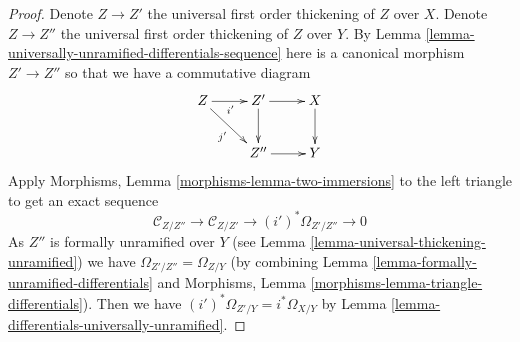 \documentclass[10pt,a4paper]{amsart}
\theoremstyle{plain}
\theoremstyle{definition}
\theoremstyle{remark}
\numberwithin{equation}{subsection}
\begin{document}
\begin{proof}
Denote $Z \to Z'$ the universal first order thickening of $Z$ over $X$.
Denote $Z \to Z''$ the universal first order thickening of $Z$ over $Y$.
By
Lemma \ref{lemma-universally-unramified-differentials-sequence}
here is a canonical morphism $Z' \to Z''$ so that we have a commutative
diagram
$$
\xymatrix{
Z \ar[r]_{i'} \ar[rd]_{j'} & Z' \ar[r] \ar[d] & X \ar[d] \\
& Z'' \ar[r] & Y
}
$$
Apply
Morphisms, Lemma \ref{morphisms-lemma-two-immersions}
to the left triangle to get an exact sequence
$$
\mathcal{C}_{Z/Z''} \to
\mathcal{C}_{Z/Z'} \to
(i')^*\Omega_{Z'/Z''} \to 0
$$
As $Z''$ is formally unramified over $Y$ (see
Lemma \ref{lemma-universal-thickening-unramified})
we have
$\Omega_{Z'/Z''} = \Omega_{Z/Y}$ (by combining
Lemma \ref{lemma-formally-unramified-differentials}
and
Morphisms, Lemma \ref{morphisms-lemma-triangle-differentials}).
Then we have $(i')^*\Omega_{Z'/Y} = i^*\Omega_{X/Y}$ by
Lemma \ref{lemma-differentials-universally-unramified}.
\end{proof}
\end{document}
